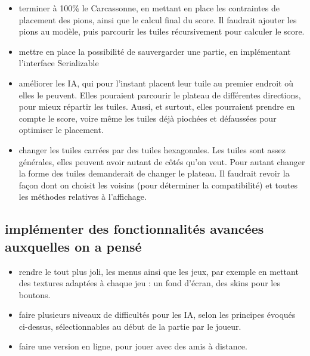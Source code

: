 \documentclass{article}
\begin{document}
\begin{itemize}
    \item terminer à 100\% le Carcassonne, en mettant en place les contraintes de placement des pions, ainsi que le calcul final du score. Il faudrait ajouter les pions au modèle, puis parcourir les tuiles récursivement pour calculer le score.
    \item mettre en place la possibilité de sauvergarder une partie, en implémentant l'interface Serializable
    \item améliorer les IA, qui pour l'instant placent leur tuile au premier endroit où elles le peuvent. Elles pouraient parcourir le plateau de différentes directions, pour mieux répartir les tuiles. Aussi, et surtout, elles pourraient prendre en compte le score, voire même les tuiles déjà piochées et défaussées pour optimiser le placement.
    \item changer les tuiles carrées par des tuiles hexagonales. Les tuiles sont assez générales, elles peuvent avoir autant de côtés qu'on veut. Pour autant changer la forme des tuiles demanderait de changer le plateau. Il faudrait revoir la façon dont on choisit les voisins (pour déterminer la compatibilité) et toutes les méthodes relatives à l'affichage. 
\end{itemize}

\subsection{implémenter des fonctionnalités avancées auxquelles on a pensé}

\begin{itemize}
\item rendre le tout plus joli, les menus ainsi que les jeux, par exemple en mettant des textures adaptées à chaque jeu : un fond d'écran, des skins pour les boutons.
    \item faire plusieurs niveaux de difficultés pour les IA, selon les principes évoqués ci-dessus,  sélectionnables au début de la partie par le joueur.
    \item faire une version en ligne, pour jouer avec des amis à distance.
\end{itemize}
    
\end{document}
